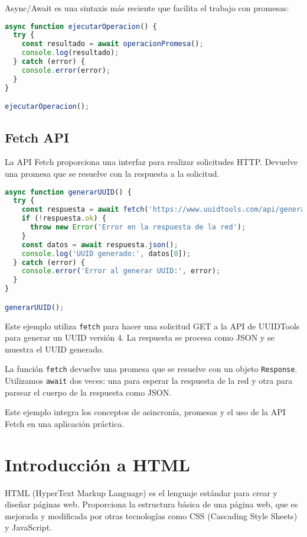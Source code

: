 \documentclass{book}
\begin{document}
Async/Await es una sintaxis más reciente que facilita el trabajo con promesas:

\begin{lstlisting}[language=JavaScript]
async function ejecutarOperacion() {
  try {
    const resultado = await operacionPromesa();
    console.log(resultado);
  } catch (error) {
    console.error(error);
  }
}

ejecutarOperacion();
\end{lstlisting}

\section{Fetch API}

La API Fetch proporciona una interfaz para realizar solicitudes HTTP. Devuelve una promesa que se resuelve con la respuesta a la solicitud.

\begin{lstlisting}[language=JavaScript]
async function generarUUID() {
  try {
    const respuesta = await fetch('https://www.uuidtools.com/api/generate/v4');
    if (!respuesta.ok) {
      throw new Error('Error en la respuesta de la red');
    }
    const datos = await respuesta.json();
    console.log('UUID generado:', datos[0]);
  } catch (error) {
    console.error('Error al generar UUID:', error);
  }
}

generarUUID();
\end{lstlisting}

Este ejemplo utiliza \texttt{fetch} para hacer una solicitud GET a la API de UUIDTools para generar un UUID versión 4. La respuesta se procesa como JSON y se muestra el UUID generado.

La función \texttt{fetch} devuelve una promesa que se resuelve con un objeto \texttt{Response}. Utilizamos \texttt{await} dos veces: una para esperar la respuesta de la red y otra para parsear el cuerpo de la respuesta como JSON.

Este ejemplo integra los conceptos de asincronía, promesas y el uso de la API Fetch en una aplicación práctica.

\newpage

\printbibliography

\appendix
\chapter{Introducción a HTML}

HTML (HyperText Markup Language) es el lenguaje estándar para crear y diseñar páginas web. Proporciona la estructura básica de una página web, que es mejorada y modificada por otras tecnologías como CSS (Cascading Style Sheets) y JavaScript.
\end{document}
